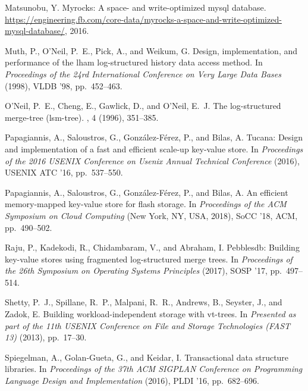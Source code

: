 \documentclass[sigplan,10pt]{acmart}
\begin{document}
\begin{thebibliography}{10}
{\sc Matsunobu, Y.}
\newblock Myrocks: A space- and write-optimized mysql database.
\newblock
  \url{https://engineering.fb.com/core-data/myrocks-a-space-and-write-optimized-mysql-database/},
  2016.

{\sc Muth, P., O'Neil, P.~E., Pick, A., and Weikum, G.}
\newblock Design, implementation, and performance of the lham log-structured
  history data access method.
\newblock In {\em Proceedings of the 24rd International Conference on Very
  Large Data Bases\/} (1998), VLDB '98, pp.~452--463.

{\sc O'Neil, P.~E., Cheng, E., Gawlick, D., and O'Neil, E.~J.}
\newblock The log-structured merge-tree (lsm-tree).
, 4 (1996), 351--385.

{\sc Papagiannis, A., Saloustros, G., Gonz\'{a}lez-F{\'e}rez, P., and Bilas,
  A.}
\newblock Tucana: Design and implementation of a fast and efficient scale-up
  key-value store.
\newblock In {\em Proceedings of the 2016 USENIX Conference on Usenix Annual
  Technical Conference\/} (2016), USENIX ATC '16, pp.~537--550.

{\sc Papagiannis, A., Saloustros, G., Gonz\'{a}lez-F{\'e}rez, P., and Bilas,
  A.}
\newblock An efficient memory-mapped key-value store for flash storage.
\newblock In {\em Proceedings of the ACM Symposium on Cloud Computing\/} (New
  York, NY, USA, 2018), SoCC '18, ACM, pp.~490--502.

{\sc Raju, P., Kadekodi, R., Chidambaram, V., and Abraham, I.}
\newblock Pebblesdb: Building key-value stores using fragmented log-structured
  merge trees.
\newblock In {\em Proceedings of the 26th Symposium on Operating Systems
  Principles\/} (2017), SOSP '17, pp.~497--514.

{\sc Shetty, P.~J., Spillane, R.~P., Malpani, R.~R., Andrews, B., Seyster, J.,
  and Zadok, E.}
\newblock Building workload-independent storage with vt-trees.
\newblock In {\em Presented as part of the 11th {USENIX} Conference on File and
  Storage Technologies ({FAST} 13)\/} (2013), pp.~17--30.

{\sc Spiegelman, A., Golan-Gueta, G., and Keidar, I.}
\newblock Transactional data structure libraries.
\newblock In {\em Proceedings of the 37th ACM SIGPLAN Conference on Programming
  Language Design and Implementation\/} (2016), PLDI '16, pp.~682--696.


\end{thebibliography}
\end{document}
